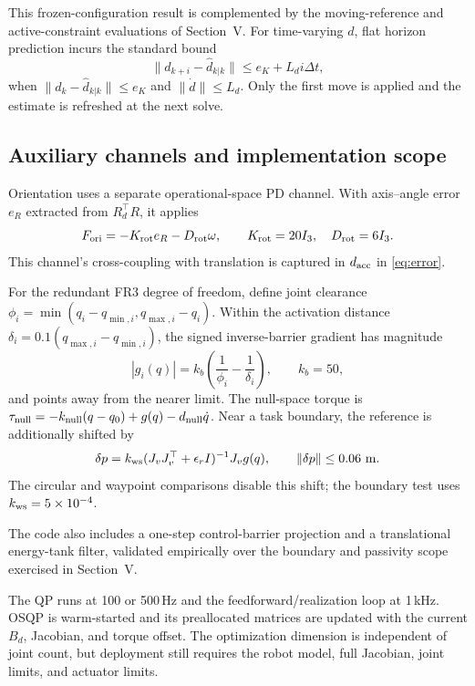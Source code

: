 \documentclass[conference]{IEEEtran}
\newcommand{\dhat}{\hat d}
\begin{document}
This frozen-configuration result is complemented by the moving-reference
and active-constraint evaluations of Section~V. For time-varying $d$,
flat horizon prediction incurs the standard bound
\begin{equation}
\|d_{k+i}-\dhat_{k|k}\|\le e_K+L_di\Delta t,
\label{eq:predictionbound}
\end{equation}
when $\|d_k-\dhat_{k|k}\|\le e_K$ and $\|\dot d\|\le L_d$. Only the first
move is applied and the estimate is refreshed at the next solve.

\subsection{Auxiliary channels and implementation scope}

Orientation uses a separate operational-space PD channel. With axis--angle
error $e_R$ extracted from $R_d^\top R$, it applies
\begin{equation}
F_{\rm ori}=-K_{\rm rot}e_R-D_{\rm rot}\omega,\qquad
K_{\rm rot}=20I_3,\quad D_{\rm rot}=6I_3.
\label{eq:orientation}
\end{equation}
This channel's cross-coupling with translation is captured in
$d_{\rm acc}$ in \eqref{eq:error}.

For the redundant FR3 degree of freedom, define joint clearance
$\phi_i=\min(q_i-q_{\min,i},q_{\max,i}-q_i)$. Within the activation distance
$\delta_i=0.1(q_{\max,i}-q_{\min,i})$, the signed inverse-barrier gradient has
magnitude
\begin{equation}
|g_i(q)|=k_b\left(\frac1{\phi_i}-\frac1{\delta_i}\right),\qquad k_b=50,
\label{eq:softbarrier}
\end{equation}
and points away from the nearer limit. The null-space torque is
$\tau_{\rm null}=-k_{\rm null}(q-q_0)+g(q)-d_{\rm null}\dot q$. Near a task
boundary, the reference is additionally shifted by
\begin{equation}
\delta p=k_{\rm ws}(J_vJ_v^\top+\epsilon_rI)^{-1}J_vg(q),\qquad
\|\delta p\|\le0.06\ {\rm m}.
\label{eq:workspace}
\end{equation}
The circular and waypoint comparisons disable this shift; the boundary test
uses $k_{\rm ws}=5\times10^{-4}$.

The code also includes a one-step control-barrier projection and a
translational energy-tank filter, validated empirically over the
boundary and passivity scope exercised in Section~V.

The QP runs at 100 or 500\,Hz and the feedforward/realization loop at 1\,kHz.
OSQP \cite{stellato2020osqp} is warm-started and its preallocated matrices are
updated with the current $B_d$, Jacobian, and torque offset. The optimization
dimension is independent of joint count, but deployment still requires the
robot model, full Jacobian, joint limits, and actuator limits.
\end{document}
